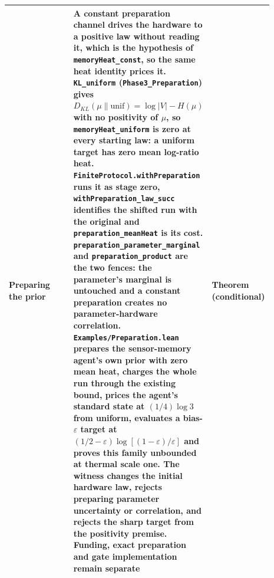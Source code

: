 \documentclass{article}
\begin{document}
\begin{longtable}{|>{\raggedright\arraybackslash}p{0.26\linewidth}|>{\raggedright\arraybackslash}p{0.46\linewidth}|>{\raggedright\arraybackslash}p{0.17\linewidth}|}
Preparing the prior & A constant preparation channel drives the hardware to a positive law without reading it, which is the hypothesis of \nolinkurl{memoryHeat_const}, so the same heat identity prices it. \nolinkurl{KL_uniform} (\nolinkurl{Phase3_Preparation}) gives $D_{KL}(\mu\|\mathrm{unif})=\log|V|-H(\mu)$ with no positivity of $\mu$, so \nolinkurl{memoryHeat_uniform} is zero at every starting law: a uniform target has zero mean log-ratio heat. \nolinkurl{FiniteProtocol.withPreparation} runs it as stage zero, \nolinkurl{withPreparation_law_succ} identifies the shifted run with the original and \nolinkurl{preparation_meanHeat} is its cost. \nolinkurl{preparation_parameter_marginal} and \nolinkurl{preparation_product} are the two fences: the parameter's marginal is untouched and a constant preparation creates no parameter-hardware correlation. \texttt{Examples/Preparation.lean} prepares the sensor-memory agent's own prior with zero mean heat, charges the whole run through the existing bound, prices the agent's standard state at $(1/4)\log3$ from uniform, evaluates a bias-$\varepsilon$ target at $(1/2-\varepsilon)\log[(1-\varepsilon)/\varepsilon]$ and proves this family unbounded at thermal scale one. The witness changes the initial hardware law, rejects preparing parameter uncertainty or correlation, and rejects the sharp target from the positivity premise. Funding, exact preparation and gate implementation remain separate & Theorem (conditional) \\ \hline

\end{longtable}
\end{document}
